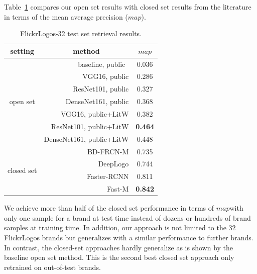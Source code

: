 \documentclass[a4paper,twoside]{article}
\newcommand{\map}{$\mathit{map}$}
\begin{document}
%
Table~\ref{tab:mapFlickr} compares our open set results with closed set results from the literature in terms of the mean average precision (\map). 
%
\begin{table}[t]
\centering
\begingroup	
\setlength{\tabcolsep}{6pt}
\caption{FlickrLogos-32 test set retrieval results.}
\label{tab:mapFlickr}
\begin{small}
\begin{tabular}{crc}
\textbf{setting} & \multicolumn{1}{c}{\textbf{method}} & \textbf{\map} \bigstrut[b]\\
\hline
\multirow{7}[2]{*}{\begin{sideways}open set\end{sideways}} & baseline, public~\cite{su2016} & 0.036 \bigstrut[t]\\
      & VGG16, public & 0.286 \\
      & ResNet101, public & 0.327 \\
      & DenseNet161, public & 0.368 \\
\cline{2-3}      
      & VGG16, public+\ac{LitW} & 0.382 \bigstrut[t]\\
      & ResNet101, public+\ac{LitW} & \textbf{0.464} \\
      & DenseNet161, public+\ac{LitW} & 0.448  \bigstrut[b]\\      
\hline
\multirow{4}[1]{*}{\begin{sideways}closed set\end{sideways}} & BD-FRCN-M \cite{oliveira2016} & 0.735 \bigstrut[t]\\	
      & DeepLogo \cite{iandola2015} & 0.744 \\ 
      & Faster-RCNN \cite{su2016} & 0.811 \\
      & Fast-M \cite{bao2016} & \textbf{0.842} \\
\end{tabular}%
\end{small}
\endgroup
\end{table}
We achieve more than half of the closed set performance in terms of \map with only one sample for a brand at test time instead of dozens or hundreds of brand samples at training time. In addition, our approach is not limited to the 32 FlickrLogos brands but generalizes with a similar performance to further brands. In contrast, the closed-set approaches hardly generalize as is shown by the baseline open set method. This is the second best closed set approach only retrained on out-of-test brands.
\end{document}
